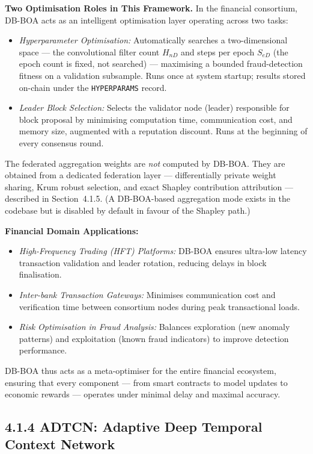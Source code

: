 \textbf{Two Optimisation Roles in This Framework.}
In the financial consortium, DB-BOA acts as an intelligent optimisation layer operating across two tasks:
\begin{itemize}
    \item \textit{Hyperparameter Optimisation:} Automatically searches a two-dimensional space — the convolutional filter count $H_{nD}$ and steps per epoch $S_{eD}$ (the epoch count is fixed, not searched) — maximising a bounded fraud-detection fitness on a validation subsample. Runs once at system startup; results stored on-chain under the \texttt{HYPERPARAMS} record.
    \item \textit{Leader Block Selection:} Selects the validator node (leader) responsible for block proposal by minimising computation time, communication cost, and memory size, augmented with a reputation discount. Runs at the beginning of every consensus round.
\end{itemize}
The federated aggregation weights are \emph{not} computed by DB-BOA. They are obtained from a dedicated federation layer — differentially private weight sharing, Krum robust selection, and exact Shapley contribution attribution — described in Section~4.1.5. (A DB-BOA-based aggregation mode exists in the codebase but is disabled by default in favour of the Shapley path.)

\textbf{Financial Domain Applications:}
\begin{itemize}
    \item \textit{High-Frequency Trading (HFT) Platforms:} DB-BOA ensures ultra-low latency transaction validation and leader rotation, reducing delays in block finalisation.
    \item \textit{Inter-bank Transaction Gateways:} Minimises communication cost and verification time between consortium nodes during peak transactional loads.
    \item \textit{Risk Optimisation in Fraud Analysis:} Balances exploration (new anomaly patterns) and exploitation (known fraud indicators) to improve detection performance.
\end{itemize}

DB-BOA thus acts as a meta-optimiser for the entire financial ecosystem, ensuring that every component — from smart contracts to model updates to economic rewards — operates under minimal delay and maximal accuracy.

\subsection*{4.1.4 ADTCN: Adaptive Deep Temporal Context Network}

